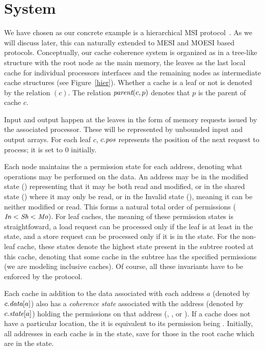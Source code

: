 \section{System}
\label{sec:System}

We have chosen as our concrete example is a hierarchical
MSI protocol~\cite{MSI}. As we will
discuss later, this can naturally extended to MESI and MOESI based protocols.
Conceptually, our cache coherence system is
organized as in a tree-like structure with the root node as the main
memory, the leaves as the last local cache for individual processors
interfaces and the remaining nodes as intermediate cache structures
(see Figure~\ref{hier}). Whether a cache is a leaf or not is denoted
by the relation \leaf$(c)$.  The relation $\textit{parent}(c, p)$
denotes that $p$ is the parent of cache $c$.

Input and output happen at the leaves in the form of memory requests
issued by the associated processor. These will be represented by
unbounded input and output arrays. For each leaf $c$, $c.\textit{pos}$ represents the
position of the next request to process; it is set to $0$ initially.

Each node maintains the a permission state for
each address, denoting what operations may be performed on the
data. An address may be in the modified state (\Mo) representing that
it may be both read and modified, or in the shared state (\Sh) where
it may only be read, or in the Invalid state (\In), meaning it can be
neither modified or read. This forms a natural total order of
permissions ($\textit{In} < \textit{Sh} < \textit{Mo}$). For leaf caches, the meaning of these
permission states is straightfoward, a load request can be processed only if the
leaf is at least in the \Sh{} state, and a store request can be processed only
if it is in the \Mo{} state. For the non-leaf cache, these states denote the
highest state present in the subtree rooted at this cache, denoting that some
cache in the subtree has the specified permissions (we are modeling inclusive
caches). Of course, all these invariants have to be enforced by the protocol.

Each cache in addition to the data associated with each address $a$
(denoted by $c.\textit{data}[a]$) also has a \emph{coherence state}
associated with the address (denoted by $c.\textit{state}[a]$) holding the
permissions on that address (\Mo, \Sh, or \In). If a cache does not have a
particular location, the it is equivalent to its permission being \In.
Initially, all addresses in each cache is in the \In state, save for those in
the root cache which are in the \Mo state.

